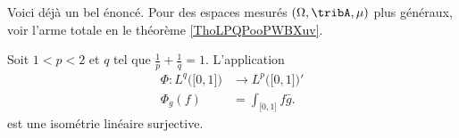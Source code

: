 Voici déjà un bel énoncé. Pour des espaces mesurés \( (\Omega,\tribA,\mu)\) plus généraux, voir l'arme totale en le théorème \ref{ThoLPQPooPWBXuv}.

\begin{proposition} \label{PropOAVooYZSodR}
	Soit \( 1<p<2\) et \( q\) tel que \( \frac{1}{ p }+\frac{1}{ q }=1\). L'application
	\begin{equation}
		\begin{aligned}
			\Phi\colon L^q\big( \mathopen[ 0 , 1 \mathclose] \big) & \to  L^p\big( \mathopen[ 0 , 1 \mathclose] \big)' \\
			\Phi_g(f)                                              & = \int_{\mathopen[ 0 , 1 \mathclose]}f\bar g.
		\end{aligned}
	\end{equation}
	est une isométrie linéaire surjective.
\end{proposition}

